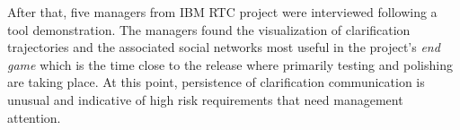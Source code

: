 
After that, five managers from IBM RTC project were interviewed following a tool demonstration. 
The managers found the visualization of clarification trajectories and the associated social networks most useful in the project's \emph{end game} which is the time close to the release where primarily testing and polishing are taking place. 
At this point, persistence of  clarification communication is unusual and indicative of high risk requirements that need management attention.

